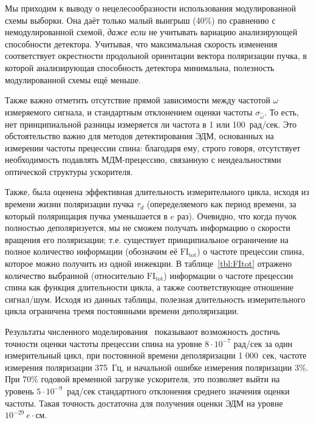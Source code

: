 Мы приходим к выводу о нецелесообразности использования модулированной схемы выборки. Она даёт только
малый выигрыш (40\%) по сравнению с немодулированной схемой, \emph{даже если} не учитывать вариацию 
анализирующей способности детектора. Учитывая, что максимальная скорость изменения соответствует
окрестности продольной ориентации вектора поляризации пучка, в которой анализирующая способность 
детектора минимальна, полезность модулированной схемы ещё меньше.

Также важно отметить отсутствие прямой зависимости между частотой $\omega$ измеряемого сигнала, 
и стандартным отклонением оценки частоты $\sigma_{\hat\omega}$. То есть, нет принципиальной разницы
измеряется ли частота в 1 или 100~рад/сек. Это обстоятельство важно для методов детектирования ЭДМ, 
основанных на измерении частоты прецессии спина: благодаря ему, строго говоря, 
отсутствует необходимость подавлять МДМ-прецессию, связанную с неидеальностями 
оптической структуры ускорителя.

Также, была оценена эффективная длительность измерительного цикла, 
исходя из времени жизни поляризации пучка  $\tau_d$ (опеределяемого как период времени, 
за который полярищация пучка уменьшается в $e$ раз). Очевидно, что когда пучок полностью деполяризуется, 
мы не сможем получать информацию о скорости вращения его поляризации; т.е. 
существует принципиальное ограничение на полное количество информации (обозначим её $\mathrm{FI_{tot}}$) 
о частоте прецессии спина, которое можно получить из одной инжекции.
В таблице~\ref{tbl:FItot} отражено количество выбранной (относительно $\mathrm{FI_{tot}}$) информации 
о частоте прецессии спина как функция длительности цикла, а также соответствующее отношение
сигнал/шум. Исходя из данных таблицы, полезная длительность измерительного цикла 
ограничена тремя постоянными времени деполяризации.

Результаты численного моделирования~\cite{Aksentev:Stats} показывают 
возможность достичь точности оценки частоты прецессии спина 
на уровне ${8\cdot 10^{-7}}$ рад/сек за один измерительный цикл, при постоянной времени деполяризации 
1 000~сек, частоте измерения поляризации 375~Гц, и начальной ошибке измерения поляризации 3\%. 
При 70\%  годовой временной загрузке ускорителя, это позволяет выйти на уровень 
${5\cdot 10^{-9}}$~рад/сек стандартного отклонения среднего значения оценки частоты. 
Такая точность достаточна для получения оценки ЭДМ на уровне $10^{-29}~e\cdot$см.

